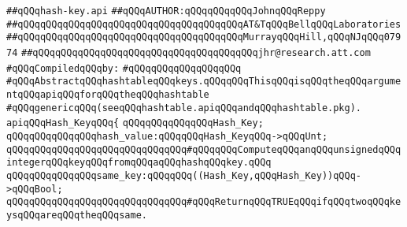 \label{src/lib/src/hash-key.api}
\verb|##qQQqhash-key.api|\newline
\verb|##qQQqAUTHOR:qQQqqQQqqQQqJohnqQQqReppy|\newline
\verb|##qQQqqQQqqQQqqQQqqQQqqQQqqQQqqQQqqQQqqQQqAT&TqQQqBellqQQqLaboratories|\newline
\verb|##qQQqqQQqqQQqqQQqqQQqqQQqqQQqqQQqqQQqqQQqMurrayqQQqHill,qQQqNJqQQq07974|\newline
\verb|##qQQqqQQqqQQqqQQqqQQqqQQqqQQqqQQqqQQqqQQqjhr@research.att.com|\newline
\newline
\verb|#qQQqCompiledqQQqby:|\newline
\verb|#qQQqqQQqqQQqqQQqqQQq|\newline
\newline
\newline
\newline
\newline
\newline
\verb|#qQQqAbstractqQQqhashtableqQQqkeys.qQQqqQQqThisqQQqisqQQqtheqQQqargumentqQQqapiqQQqforqQQqtheqQQqhashtable|\newline
\verb|#qQQqgenericqQQq(seeqQQqhashtable.apiqQQqandqQQqhashtable.pkg).|\newline
\newline
\newline
\verb|apiqQQqHash_KeyqQQq{|\newline
\newline
\verb|qQQqqQQqqQQqqQQqHash_Key;|\newline
\newline
\newline
\newline
\verb|qQQqqQQqqQQqqQQqhash_value:qQQqqQQqHash_KeyqQQq->qQQqUnt;|\newline
\newline
\verb|qQQqqQQqqQQqqQQqqQQqqQQqqQQqqQQq#qQQqqQQqComputeqQQqanqQQqunsignedqQQqintegerqQQqkeyqQQqfromqQQqaqQQqhashqQQqkey.qQQq|\newline
\newline
\newline
\newline
\verb|qQQqqQQqqQQqqQQqsame_key:qQQqqQQq((Hash_Key,qQQqHash_Key))qQQq->qQQqBool;|\newline
\newline
\verb|qQQqqQQqqQQqqQQqqQQqqQQqqQQqqQQq#qQQqReturnqQQqTRUEqQQqifqQQqtwoqQQqkeysqQQqareqQQqtheqQQqsame.|\newline
